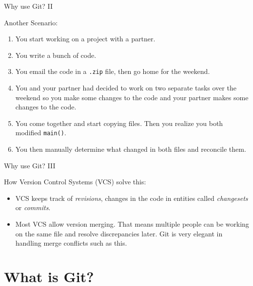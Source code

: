 \documentclass{beeper}
\begin{document}
\begin{frame}{Why use Git? II}

    Another Scenario:

    \begin{enumerate}[<+->]
        \item You start working on a project with a partner.
        \item You write a bunch of code.
        \item You email the code in a \texttt{.zip} file, then go home for the
            weekend.
        \item You and your partner had decided to work on two separate tasks
            over the weekend so you make some changes to the code and your
            partner makes some changes to the code.
        \item You come together and start copying files. Then you realize you
            both modified \texttt{main()}.
        \item You then manually determine what changed in both files and
            reconcile them.
    \end{enumerate}

\end{frame}

\begin{frame}{Why use Git? III}

    How Version Control Systems (VCS) solve this:

    \begin{itemize}[<+->]
        \item VCS keeps track of \textit{revisions}, changes in the code in
            entities called \textit{changesets} or \textit{commits}.
        \item Most VCS allow version merging. That means multiple people can be
            working on the same file and resolve discrepancies later. Git is
            very elegant in handling merge conflicts such as this.
    \end{itemize}
\end{frame}

\section{What is Git?}
\end{document}
